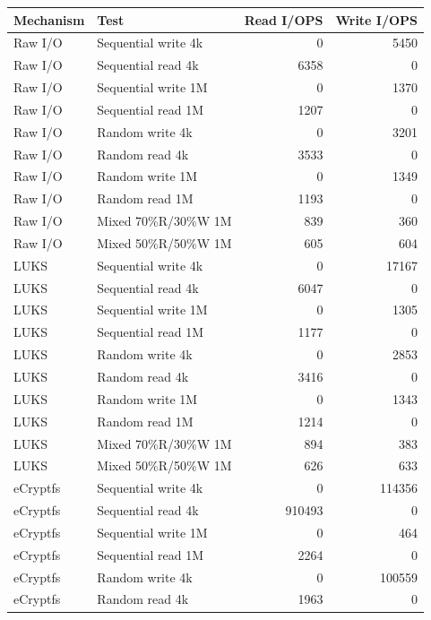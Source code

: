\documentclass[a4paper]{article}
\begin{document}
\begin{table}[H]
    \centering
    \small
    \begin{tabular}{|l|l|r|r|}
        \hline
        Mechanism & Test & Read I/OPS & Write I/OPS \\
        \hline
        Raw I/O & Sequential write 4k & 0 & 5450 \\
        Raw I/O & Sequential read 4k & 6358 & 0 \\
        Raw I/O & Sequential write 1M & 0 & 1370 \\
        Raw I/O & Sequential read 1M & 1207 & 0 \\
        Raw I/O & Random write 4k & 0 & 3201 \\
        Raw I/O & Random read 4k & 3533 & 0 \\
        Raw I/O & Random write 1M & 0 & 1349 \\
        Raw I/O & Random read 1M & 1193 & 0 \\
        Raw I/O & Mixed 70\%R/30\%W 1M & 839 & 360 \\
        Raw I/O & Mixed 50\%R/50\%W 1M & 605 & 604 \\
        LUKS & Sequential write 4k & 0 & 17167 \\
        LUKS & Sequential read 4k & 6047 & 0 \\
        LUKS & Sequential write 1M & 0 & 1305 \\
        LUKS & Sequential read 1M & 1177 & 0 \\
        LUKS & Random write 4k & 0 & 2853 \\
        LUKS & Random read 4k & 3416 & 0 \\
        LUKS & Random write 1M & 0 & 1343 \\
        LUKS & Random read 1M & 1214 & 0 \\
        LUKS & Mixed 70\%R/30\%W 1M & 894 & 383 \\
        LUKS & Mixed 50\%R/50\%W 1M & 626 & 633 \\
        eCryptfs & Sequential write 4k  & 0 & 114356 \\
        eCryptfs & Sequential read 4k  & 910493 & 0 \\
        eCryptfs & Sequential write 1M  & 0 & 464 \\
        eCryptfs & Sequential read 1M  & 2264 & 0 \\
        eCryptfs & Random write 4k  & 0 & 100559 \\
        eCryptfs & Random read 4k  & 1963 & 0 \\

\end{tabular}
\end{table}
\end{document}
